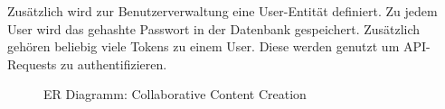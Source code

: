 Zusätzlich wird zur Benutzerverwaltung eine User-Entität definiert.  Zu jedem
User wird das gehashte Passwort in der Datenbank gespeichert.  Zusätzlich
gehören beliebig viele Tokens zu einem User.  Diese werden genutzt um
API-Requests zu authentifizieren.

\begin{figure}
    \centering
    
    \caption{ER Diagramm: Collaborative Content Creation}
    \label{fig:er_ccc}
\end{figure}
